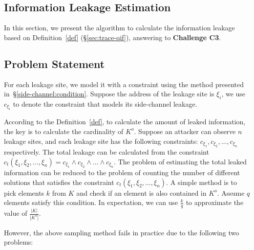 \subsection{Information Leakage Estimation}

\newcommand{\addr}[1]{{l}_{#1}}
\renewcommand{\addr}[1]{{\gamma}_{#1}}
\renewcommand{\addr}[1]{{\zeta}_{#1}}
\renewcommand{\addr}[1]{{\xi}_{#1}}

In this section, we present the algorithm to calculate the information leakage
based on Definition~\ref{def} (\S\ref{sec:trace-qif}), answering to
\textbf{Challenge C3}.

\subsection{Problem Statement}
For each leakage site, we model it with a constraint using the
method presented in~\S\ref{side-channel:condition}. Suppose the address of the
leakage site is $\addr{i}$, we use $c_{\addr{i}}$ to denote the constraint
that models its side-channel leakage.

According to the Definition~\ref{def}, to calculate the amount of leaked
information, the key is to calculate the cardinality
of $K^o$. Suppose an attacker can observe $n$ leakage sites, and each leakage
site has the following constraints: $c_{\addr{1}}, c_{\addr{2}}, \ldots,
    c_{\addr{n}}$ respectively. The total leakage can be calculated from the constraint
$c_t({\addr{1}},{\addr{2}},\ldots,{\addr{n}}) = c_{\addr{1}} \land c_{\addr{2}}
    \land \ldots \land c_{\addr{n}}$.
The problem of estimating the total leaked
information can be reduced to the problem of counting the number of different
solutions that satisfies the constraint
$c_t({\addr{1}},{\addr{2}},\ldots,{\addr{n}})$.
A simple method is to pick elements $k$ from $K$ and check if an
element is also contained in $K^o$. Assume $q$ elements satisfy this condition. In
expectation, we can use $\frac{k}{q}$ to approximate the value of
$\frac{|K|}{|K^o|}$.

However, the above sampling method fails in practice due to the following two problems:

